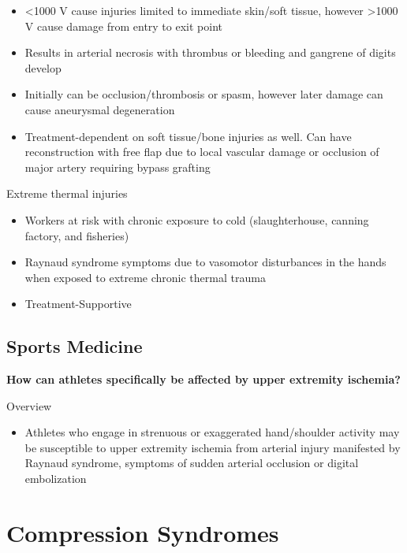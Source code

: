 \documentclass[
]{book}
\providecommand{\tightlist}{%
  \setlength{\itemsep}{0pt}\setlength{\parskip}{0pt}}
\begin{document}
\begin{itemize}
\item
  \textless1000 V cause injuries limited to immediate skin/soft tissue,
  however \textgreater1000 V cause damage from entry to exit point~
\item
  Results in arterial necrosis with thrombus or bleeding and gangrene
  of digits develop~
\item
  Initially can be occlusion/thrombosis or spasm, however later damage
  can cause aneurysmal degeneration~
\item
  Treatment-dependent on soft tissue/bone injuries as well. Can have
  reconstruction with free flap due to local vascular damage or
  occlusion of major artery requiring bypass grafting
\end{itemize}

Extreme thermal injuries

\begin{itemize}
\item
  Workers at risk with chronic exposure to cold (slaughterhouse,
  canning factory, and fisheries)
\item
  Raynaud syndrome symptoms due to vasomotor disturbances in the hands
  when exposed to extreme chronic thermal trauma
\item
  Treatment-Supportive~
\end{itemize}

\hypertarget{sports-medicine}{%
\subsection{Sports Medicine}\label{sports-medicine}}

\textbf{How can athletes specifically be affected by upper extremity
ischemia?}

Overview

\begin{itemize}
\tightlist
\item
  Athletes who engage in strenuous or exaggerated hand/shoulder
  activity may be susceptible to upper extremity ischemia from
  arterial injury manifested by Raynaud syndrome, symptoms of sudden
  arterial occlusion or digital embolization
\end{itemize}

\hypertarget{compression-syndromes}{%
\section{Compression Syndromes}\label{compression-syndromes}}
\end{document}
